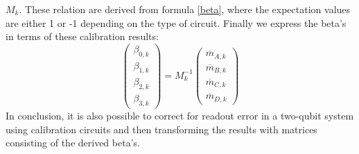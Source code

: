 $M_k$. These relation are derived from formula \ref{beta}, where the expectation
values are either 1 or -1 depending on the type of circuit. Finally we express
the beta's in terms of these calibration results:
\begin{equation}
\begin{pmatrix} \beta_{0,k} \\ \beta_{1,k} \\ \beta_{2,k} \\ \beta_{3,k}
\end{pmatrix}=M_k^{-1}
\begin{pmatrix} \overline{m}_{A,k} \\ \overline{m}_{B,k} \\ \overline{m}_{C,k}
\\ \overline{m}_{D,k}
\end{pmatrix}
\end{equation} In conclusion, it is also possible to correct for readout error
in a two-qubit system using calibration circuits and then transforming the
results with matrices consisting of the derived beta's.

